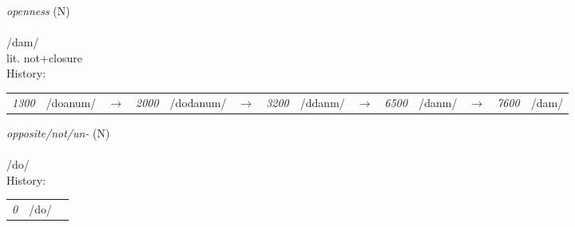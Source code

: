 \vspace{15pt}
\begin{nopagebreak}
 \textit{openness} (N)\\
\\
\noindent /d{\textprimstress}am/\\
\noindent lit. not+closure\\


\noindent History:

\vspace{-0pt}
\hspace{40pt}
\begin{tabular}{ccc}
\textit{1300} & /do{}anum/&$\rightarrow$ & \textit{2000} & /dodanum/&$\rightarrow$ & \textit{3200} & /ddanm/&$\rightarrow$ & \textit{6500} & /danm/&$\rightarrow$ & \textit{7600} & /dam/& \\
\end{tabular}

\vspace{20pt}\hline

\end{nopagebreak}
\filbreak



\vspace{15pt}
\begin{nopagebreak}
 \textit{opposite/not/un-} (N)\\
\\
\noindent /d{\textprimstress}o/\\


\noindent History:

\vspace{-0pt}
\hspace{40pt}
\begin{tabular}{ccc}
\textit{0} & /do/& \\
\end{tabular}

\vspace{20pt}\hline

\end{nopagebreak}
\filbreak



